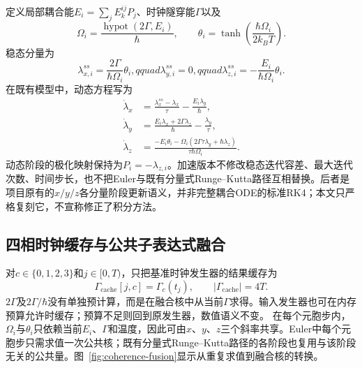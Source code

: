 \documentclass[UTF8,a4paper,11pt]{ctexart}
\begin{document}
定义局部耦合能$E_i=\sum_j E_k^{ij}P_j$、时钟隧穿能$\Gamma$以及
\begin{equation}
 \Omega_i=\frac{\operatorname{hypot}(2\Gamma,E_i)}{\hbar},\qquad
 \theta_i=\tanh\!\left(\frac{\hbar\Omega_i}{2k_BT}\right).
\end{equation}
稳态分量为
\begin{equation}
 \lambda_{x,i}^{ss}=\frac{2\Gamma}{\hbar\Omega_i}\theta_i,qquad
 \lambda_{y,i}^{ss}=0,qquad
 \lambda_{z,i}^{ss}=-\frac{E_i}{\hbar\Omega_i}\theta_i.
\end{equation}
在既有模型中，动态方程写为
\begin{align}
 \dot\lambda_x&=\frac{\lambda_x^{ss}-\lambda_x}{\tau}
                 -\frac{E_i\lambda_y}{\hbar},\\
 \dot\lambda_y&=\frac{E_i\lambda_x+2\Gamma\lambda_z}{\hbar}
                 -\frac{\lambda_y}{\tau},\\
 \dot\lambda_z&=\frac{-E_i\theta_i-\Omega_i(2\Gamma\tau\lambda_y+
                 \hbar\lambda_z)}{\tau\hbar\Omega_i}.
\end{align}
动态阶段的极化映射保持为$P_i=-\lambda_{z,i}$。加速版本不修改稳态迭代容差、最大迭代次数、时间步长，也不把Euler与既有分量式Runge--Kutta路径互相替换。后者是项目原有的$x/y/z$各分量阶段更新语义，并非完整耦合ODE的标准RK4；本文只严格复刻它，不宣称修正了积分方法。

\subsection{四相时钟缓存与公共子表达式融合}

对$c\in\{0,1,2,3\}$和$j\in[0,T)$，只把基准时钟发生器的结果缓存为
\begin{equation}
 \Gamma_{\mathrm{cache}}[j,c]=\Gamma_c(t_j),
 \qquad |\Gamma_{\mathrm{cache}}|=4T.
\end{equation}
$2\Gamma$及$2\Gamma/\hbar$没有单独预计算，而是在融合核中从当前$\Gamma$求得。输入发生器也可在内存预算允许时缓存；预算不足则回到原发生器，数值语义不变。
在每个元胞步内，$\Omega_i$与$\theta_i$只依赖当前$E_i$、$\Gamma$和温度，因此可由$x$、$y$、$z$三个斜率共享。Euler中每个元胞步只需求值一次公共核；既有分量式Runge--Kutta路径的各阶段也复用与该阶段无关的公共量。图~\ref{fig:coherence-fusion}显示从重复求值到融合核的转换。
\end{document}
